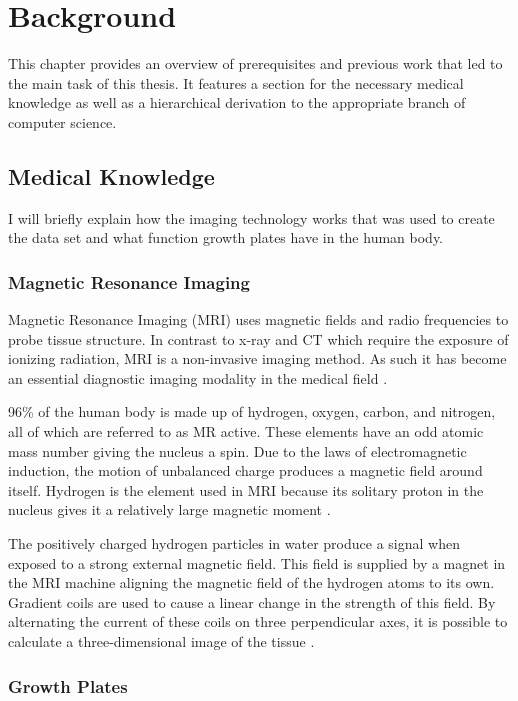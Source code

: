 \section{Background}

This chapter provides an overview of prerequisites and previous work that led to the main task of this thesis. It features a section for the necessary medical knowledge as well as a hierarchical derivation to the appropriate branch of computer science.

\subsection{Medical Knowledge}

I will briefly explain how the imaging technology works that was used to create the data set and what function growth plates have in the human body.

\subsubsection{Magnetic Resonance Imaging}

Magnetic Resonance Imaging (MRI) uses magnetic fields and radio frequencies to probe tissue structure. In contrast to x-ray and CT which require the exposure of ionizing radiation, MRI is a non-invasive imaging method. As such it has become an essential diagnostic imaging modality in the medical field \cite{Westbrook2016}.

96\% of the human body is made up of hydrogen, oxygen, carbon, and nitrogen, all of which are referred to as MR active. These elements have an odd atomic mass number giving the nucleus a spin. Due to the laws of electromagnetic induction, the motion of unbalanced charge produces a magnetic field around itself. Hydrogen is the element used in MRI because its solitary proton in the nucleus gives it a relatively large magnetic moment \cite{Westbrook2016}. 

The positively charged hydrogen particles in water produce a signal when exposed to a strong external magnetic field. This field is supplied by a magnet in the MRI machine aligning the magnetic field of the hydrogen atoms to its own. Gradient coils are used to cause a linear change in the strength of this field. By alternating the current of these coils on three perpendicular axes, it is possible to calculate a three-dimensional image of the tissue \cite{Westbrook2016}.

\subsubsection{Growth Plates}

